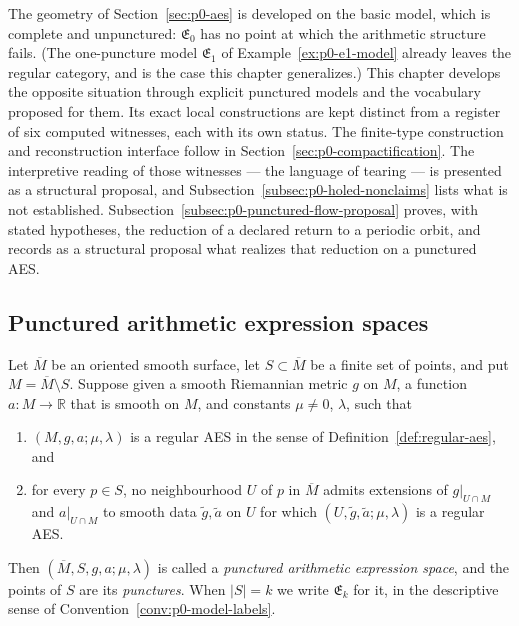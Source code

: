 The geometry of Section~\ref{sec:p0-aes} is developed on the basic model, which
is complete and unpunctured: $\mathfrak E_0$ has no point at which the
arithmetic structure fails.  (The one-puncture model $\mathfrak E_1$ of
Example~\ref{ex:p0-e1-model} already leaves the regular category, and is the
case this chapter generalizes.)  This chapter develops the opposite situation through explicit punctured
models and the vocabulary proposed for them.  Its exact local constructions
are kept distinct from a register of six computed witnesses, each with its
own status.  The finite-type construction and reconstruction interface follow
in Section~\ref{sec:p0-compactification}.  The interpretive reading of those
witnesses --- the language of tearing --- is presented as a structural proposal,
and Subsection~\ref{subsec:p0-holed-nonclaims} lists what is not established.
Subsection~\ref{subsec:p0-punctured-flow-proposal} proves, with stated
hypotheses, the reduction of a declared return to a periodic orbit, and records
as a structural proposal what realizes that reduction on a punctured AES.

\subsection{Punctured arithmetic expression spaces}
\label{subsec:p0-holed-definition}

\begin{definition}
\label{def:p0-punctured-aes}
Let $\overline M$ be an oriented smooth surface, let $S\subset\overline M$ be a
finite set of points, and put $M=\overline M\setminus S$.  Suppose given a
smooth Riemannian metric $g$ on $M$, a function $a:M\to\mathbb R$ that is smooth
on $M$, and constants $\mu\ne0$, $\lambda$, such that
\begin{enumerate}
  \item $(M,g,a;\mu,\lambda)$ is a regular AES in the sense of
  Definition~\ref{def:regular-aes}, and
  \item for every $p\in S$, no neighbourhood $U$ of $p$ in $\overline M$ admits
  extensions of $g|_{U\cap M}$ and $a|_{U\cap M}$ to smooth data
  $\widetilde g,\widetilde a$ on $U$ for which
  $(U,\widetilde g,\widetilde a;\mu,\lambda)$ is a regular AES.
\end{enumerate}
Then $(\overline M,S,g,a;\mu,\lambda)$ is called a \emph{punctured arithmetic
expression space}, and the points of $S$ are its \emph{punctures}.  When
$|S|=k$ we write $\mathfrak E_k$ for it, in the descriptive sense of
Convention~\ref{conv:p0-model-labels}.
\end{definition}

